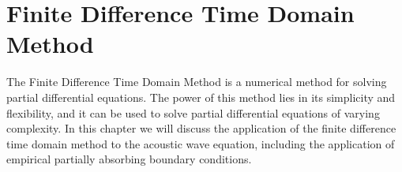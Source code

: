 %
%
%
\chapter{Finite Difference Time Domain Method}
\label{Introduction}
The Finite Difference Time Domain Method is a numerical method for solving partial differential equations. The power of this method lies in its simplicity and flexibility, and it can be used to solve partial differential equations of varying complexity. In this chapter we will discuss the application of the finite difference time domain method to the acoustic wave equation, including the application of empirical partially absorbing boundary conditions.

